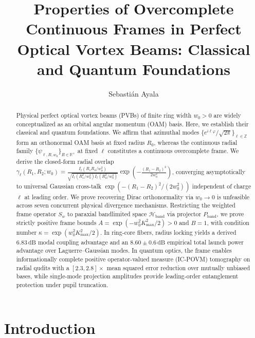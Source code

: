 \documentclass{optica-article}
\begin{document}
\title{Properties of Overcomplete Continuous Frames in Perfect Optical Vortex Beams: Classical and Quantum Foundations}

\author{Sebastián Ayala}

\address{Independent Researcher, Cauquenes, Chile}


\begin{abstract}
Physical perfect optical vortex beams (PVBs) of finite ring width $w_0 > 0$ are widely conceptualized as an orbital angular momentum (OAM) basis. Here, we establish their classical and quantum foundations. We affirm that azimuthal modes $\{e^{i\ell\varphi}/\sqrt{2\pi}\}_{\ell \in \mathbb{Z}}$ form an orthonormal OAM basis at fixed radius $R_0$, whereas the continuous radial family $\{\psi_{\ell, R, w_0}\}_{R \in \mathbb{R}^+}$ at fixed $\ell$ constitutes a continuous overcomplete frame. We derive the closed-form radial overlap $\gamma_\ell(R_1, R_2; w_0) = \frac{I_\ell(R_1 R_2 / w_0^2)}{\sqrt{I_\ell(R_1^2/w_0^2) I_\ell(R_2^2/w_0^2)}} \exp\left(-\frac{(R_1-R_2)^2}{2w_0^2}\right)$, converging asymptotically to universal Gaussian cross-talk $\exp(-(R_1-R_2)^2 / (2w_0^2))$ independent of charge $\ell$ at leading order. We prove recovering Dirac orthonormality via $w_0 \to 0$ is unfeasible across seven concurrent physical divergence mechanisms. Restricting the weighted frame operator $S_w$ to paraxial bandlimited space $\mathcal{H}_{\text{band}}$ via projector $P_{\text{band}}$, we prove strictly positive frame bounds $A = \exp(-w_0^2 K_{\max}^2 / 2) > 0$ and $B = 1$, with condition number $\kappa = \exp(w_0^2 K_{\max}^2 / 2)$. In ring-core fibers, radius locking yields a derived $6.83\,\text{dB}$ modal coupling advantage and an $8.60 \pm 0.6\,\text{dB}$ empirical total launch power advantage over Laguerre--Gaussian modes. In quantum optics, the frame enables informationally complete positive operator-valued measure (IC-POVM) tomography on radial qudits with a $[2.3, 2.8]\times$ mean squared error reduction over mutually unbiased bases, while single-mode projection amplitudes provide leading-order entanglement protection under pupil truncation.
\end{abstract}

\section{Introduction}
\label{sec:intro}
\end{document}
